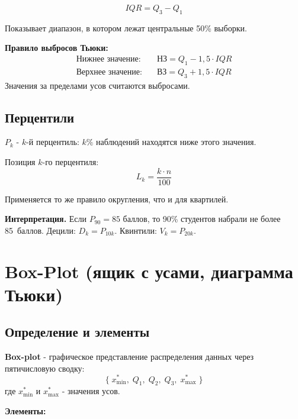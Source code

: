 \documentclass[a4paper]{article}
\begin{document}
\begin{equation}
	IQR = Q_3 - Q_1
\end{equation}

Показывает диапазон, в котором лежат центральные 50\% выборки.

\noindent\textbf{Правило выбросов Тьюки:}
\begin{align*}
	\text{Нижнее значение:} &\quad \text{НЗ} = Q_1 - 1{,}5 \cdot IQR \\
	\text{Верхнее значение:} &\quad \text{ВЗ} = Q_3 + 1{,}5 \cdot IQR
\end{align*}
Значения за пределами усов считаются выбросами.

\subsection{Перцентили}


	$P_k$ - $k$-й перцентиль: $k\%$ наблюдений находятся ниже этого значения.


\noindent Позиция $k$-го перцентиля:
\begin{equation}
	L_k = \frac{k \cdot n}{100}
\end{equation}

Применяется то же правило округления, что и для квартилей.


	\textbf{Интерпретация.} Если $P_{90} = 85$ баллов, то 90\% студентов набрали
	не более 85~баллов. Децили: $D_k = P_{10k}$. Квинтили: $V_k = P_{20k}$.


\section{Box-Plot (ящик с усами, диаграмма Тьюки)}

\subsection{Определение и элементы}


	\textbf{Box-plot}  - графическое
	представление распределения данных через пятичисловую сводку:
	\[
	\bigl\{\; x_{\min}^{*},\; Q_1,\; Q_2,\; Q_3,\; x_{\max}^{*} \;\bigr\}
	\]
	где $x_{\min}^{*}$ и $x_{\max}^{*}$ - значения усов.


\noindent\textbf{Элементы:}
\end{document}
